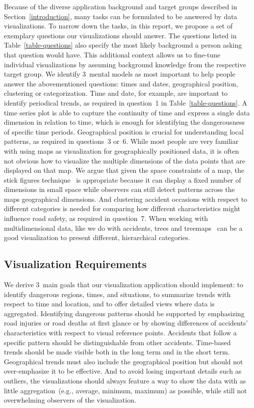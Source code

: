 Because of the diverse application background and target groups described in Section~\ref{introduction}, many tasks can be formulated to be answered by data visualizations. To narrow down the tasks, in this report, we propose a set of exemplary questions our visualizations should answer. The questions listed in Table~\ref{table-questions} also specify the most likely background a person asking that question would have. This additional context allows us to fine-tune individual visualizations by assuming background knowledge from the respective target group.
We identify 3~mental models as most important to help people answer the abovementioned questions: \Ni times and dates, \Nii geographical position, \Niii clustering or categorization.
Time and date, for example, are important to identify periodical trends, as required in question~1 in Table~\ref{table-questions}. A time series plot is able to capture the continuity of time and express a single data dimension in relation to time, which is enough for identifying the dangerousness of specific time periods.
Geographical position is crucial for understanding local patterns, as required in questions~3 or~6. While most people are very familiar with using maps as visualization for geographically positioned data, it is often not obvious how to visualize the multiple dimensions of the data points that are displayed on that map. We argue that given the space constraints of a map, the stick figures technique~\cite{PickettG1988} is appropriate because it can display a fixed number of dimensions in small space while observers can still detect patterns across the maps geographical dimensions.
And clustering accident occasions with respect to different categories is needed for comparing how different characteristics might influence road safety, as required in question~7. When working with multidimensional data, like we do with accidents, trees and treemaps~\cite{Shneiderman1992} can be a good visualization to present different, hierarchical categories.

\subsection{Visualization Requirements}
\label{requirements}
We derive 3~main goals that our visualization application should implement: \Ni to identify dangerous regions, times, and situations, \Nii to summarize trends with respect to time and location, and \Niii to offer detailed views where data is aggregated.
Identifying dangerous patterns should be supported by emphasizing road injuries or road deaths at first glance or by showing differences of accidents' characteristics with respect to visual reference points.
Accidents that follow a specific pattern should be distinguishable from other accidents.
Time-based trends should be made visible both in the long term and in the short term. Geographical trends must also include the geographical position but should not over-emphasize it to be effective.
And to avoid losing important details such as outliers, the visualizations should always feature a way to show the data with as little aggregation~(e.g., average, minimum, maximum) as possible, while still not overwhelming observers of the visualization.

